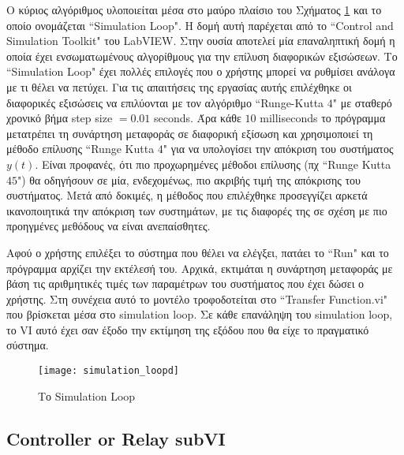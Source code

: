 Ο κύριος αλγόριθμος υλοποιείται μέσα στο μαύρο πλαίσιο του Σχήματος \ref{fig:simulation_loopd} και το οποίο ονομάζεται ``Simulation Loop". Η δομή αυτή παρέχεται από το ``Control and Simulation Toolkit" του LabVIEW. Στην ουσία αποτελεί μία επαναληπτική δομή η οποία έχει ενσωματωμένους αλγορίθμους για την επίλυση διαφορικών εξισώσεων. Το ``Simulation Loop" έχει πολλές επιλογές που ο χρήστης μπορεί να ρυθμίσει ανάλογα με τι θέλει να πετύχει. Για τις απαιτήσεις της εργασίας αυτής επιλέχθηκε οι διαφορικές εξισώσεις να επιλύονται με τον αλγόριθμο ``Runge-Kutta $4$" με σταθερό χρονικό βήμα step size $= 0.01$ seconds. Άρα κάθε $10$ milliseconds το πρόγραμμα μετατρέπει τη συνάρτηση μεταφοράς σε διαφορική εξίσωση και χρησιμοποιεί τη μέθοδο επίλυσης ``Runge Kutta $4$" για να υπολογίσει την απόκριση του συστήματος $y(t)$. Είναι προφανές, ότι πιο προχωρημένες μέθοδοι επίλυσης (πχ ``Runge Kutta $45$") θα οδηγήσουν σε μία, ενδεχομένως, πιο ακριβής τιμή της απόκρισης του συστήματος. Μετά από δοκιμές, η μέθοδος που επιλέχθηκε προσεγγίζει αρκετά ικανοποιητικά την απόκριση των συστημάτων, με τις διαφορές της σε σχέση με πιο προηγμένες μεθόδους να είναι ανεπαίσθητες.

Αφού ο χρήστης επιλέξει το σύστημα που θέλει να ελέγξει, πατάει το ``Run" και το πρόγραμμα αρχίζει την εκτέλεσή του. Αρχικά, εκτιμάται η συνάρτηση μεταφοράς με βάση τις αριθμητικές τιμές των παραμέτρων του συστήματος που έχει δώσει ο χρήστης. Στη συνέχεια αυτό το μοντέλο τροφοδοτείται στο ``Transfer Function.vi" που βρίσκεται μέσα στο simulation loop. Σε κάθε επανάληψη του simulation loop, το VI αυτό έχει σαν έξοδο την εκτίμηση της εξόδου που θα είχε το πραγματικό σύστημα.

\begin{figure}[h]
  \centering
  \texttt{[image: simulation\_loopd]}
  \caption{Το Simulation Loop}
  \label{fig:simulation_loopd}
\end{figure}

\subsection{Controller or Relay subVI}


